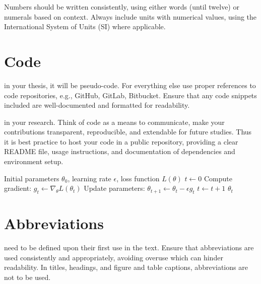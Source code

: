 \documentclass{../sharedAssets/tufte}
\begin{document}
 Numbers should be written consistently, using either words (until twelve) or numerals based on context. 
Always include units with numerical values, using the International System of Units (SI) where applicable.

\section{Code}
  \label{sec:code}

   in your thesis, it will be pseudo-code.
  For everything else use proper references to code repositories, e.g., GitHub, GitLab, Bitbucket.
  Ensure that any code snippets included are well-documented and formatted for readability.

   in your research. Think of code as a means to communicate, make your contributions transparent, reproducible, and extendable for future studies.
  Thus it is best practice to host your code in a public repository,
  providing a clear README file, usage instructions, and documentation of dependencies and environment setup.



  \begin{algorithm}[H]
  \caption{Pseudo-code for Gradient Descent Optimization}
  \begin{algorithmic}[1]
    \Require Initial parameters $\theta_0$, learning rate $\epsilon$, loss function $L(\theta)$
    \State $t \gets 0$
      \State Compute gradient: $g_t \gets \nabla_\theta L(\theta_t)$
      \State Update parameters: $\theta_{t+1} \gets \theta_t - \epsilon g_t$
      \State $t \gets t + 1$
    \EndWhile
    \Return $\theta_t$
  \end{algorithmic}
  \end{algorithm}


\vfill
\section{Abbreviations}
 need to be defined upon their first use in the text.
Ensure that abbreviations are used consistently and appropriately, avoiding overuse which can hinder readability.
In titles, headings, and figure and table captions, abbreviations are not to be used. 
\end{document}
